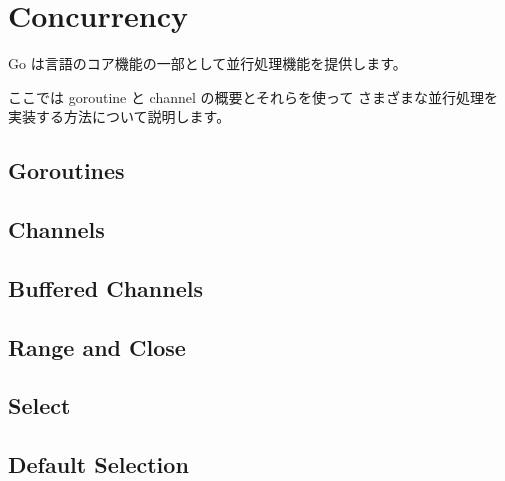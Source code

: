 \section{Concurrency}

Go は言語のコア機能の一部として並行処理機能を提供します。

ここでは goroutine と channel の概要とそれらを使って
さまざまな並行処理を実装する方法について説明します。

\subsection{Goroutines}




\subsection{Channels}




\subsection{Buffered Channels}




\subsection{Range and Close}




\subsection{Select}




\subsection{Default Selection}




